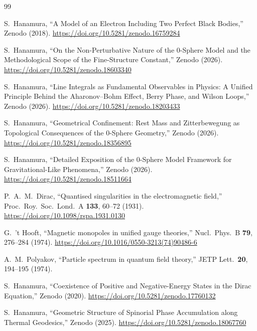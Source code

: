 \documentclass[12pt,letterpaper]{article}
\begin{document}
\begin{thebibliography}{99}

S.~Hanamura,
``A Model of an Electron Including Two Perfect Black Bodies,''
Zenodo (2018).
\href{https://doi.org/10.5281/zenodo.16759284}{https://doi.org/10.5281/zenodo.16759284}

S.~Hanamura,
``On the Non-Perturbative Nature of the 0-Sphere Model and the Methodological Scope of the Fine-Structure Constant,''
Zenodo (2026).
\href{https://doi.org/10.5281/zenodo.18603340}{https://doi.org/10.5281/zenodo.18603340}

S.~Hanamura,
``Line Integrals as Fundamental Observables in Physics: A Unified Principle Behind the Aharonov--Bohm Effect, Berry Phase, and Wilson Loops,''
Zenodo (2026).
\href{https://doi.org/10.5281/zenodo.18203433}{https://doi.org/10.5281/zenodo.18203433}

S.~Hanamura,
``Geometrical Confinement: Rest Mass and Zitterbewegung as Topological Consequences of the 0-Sphere Geometry,''
Zenodo (2026).
\href{https://doi.org/10.5281/zenodo.18356895}{https://doi.org/10.5281/zenodo.18356895}

S.~Hanamura,
``Detailed Exposition of the 0-Sphere Model Framework for Gravitational-Like Phenomena,''
Zenodo (2026).
\href{https://doi.org/10.5281/zenodo.18511664}{https://doi.org/10.5281/zenodo.18511664}

P.~A.~M.~Dirac,
``Quantised singularities in the electromagnetic field,''
Proc.\ Roy.\ Soc.\ Lond.\ A \textbf{133}, 60--72 (1931).
\href{https://doi.org/10.1098/rspa.1931.0130}{https://doi.org/10.1098/rspa.1931.0130}

G.~'t Hooft,
``Magnetic monopoles in unified gauge theories,''
Nucl.\ Phys.\ B \textbf{79}, 276--284 (1974).
\href{https://doi.org/10.1016/0550-3213(74)90486-6}{https://doi.org/10.1016/0550-3213(74)90486-6}

A.~M.~Polyakov,
``Particle spectrum in quantum field theory,''
JETP Lett.\ \textbf{20}, 194--195 (1974).

S.~Hanamura,
``Coexistence of Positive and Negative-Energy States in the Dirac Equation,''
Zenodo (2020).
\href{https://doi.org/10.5281/zenodo.17760132}{https://doi.org/10.5281/zenodo.17760132}

S.~Hanamura,
``Geometric Structure of Spinorial Phase Accumulation along Thermal Geodesics,''
Zenodo (2025).
\href{https://doi.org/10.5281/zenodo.18067760}{https://doi.org/10.5281/zenodo.18067760}


\end{thebibliography}
\end{document}
